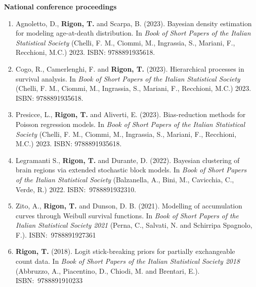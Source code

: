 \documentclass[10pt]{article}
\begin{document}
\textbf{National conference proceedings}
\begin{enumerate}
\setcounter{enumi}{\value{publications}}


\item Agnoletto, D., \textbf{Rigon, T.} and Scarpa, B. (2023). Bayesian density estimation for modeling age-at-death distribution. In \emph{Book of Short Papers of the Italian Statistical Society} (Chelli, F. M., Ciommi, M., Ingrassia, S., Mariani, F., Recchioni, M.C.) 2023. ISBN: 9788891935618. 

\item Cogo, R., Camerlenghi, F. and \textbf{Rigon, T.} (2023). Hierarchical processes in survival analysis. In \emph{Book of Short Papers of the Italian Statistical Society} (Chelli, F. M., Ciommi, M., Ingrassia, S., Mariani, F., Recchioni, M.C.) 2023. ISBN: 9788891935618. 

\item Presicce, L., \textbf{Rigon, T.} and Aliverti, E. (2023). Bias-reduction methods for Poisson regression models. In \emph{Book of Short Papers of the Italian Statistical Society} (Chelli, F. M., Ciommi, M., Ingrassia, S., Mariani, F., Recchioni, M.C.) 2023. ISBN: 9788891935618.

\item Legramanti S., \textbf{Rigon, T.} and Durante, D. (2022). Bayesian clustering of brain regions via extended stochastic block models. In \emph{Book of Short Papers of the Italian Statistical Society} (Balzanella, A., Bini, M., Cavicchia, C., Verde, R.) 2022. ISBN:~9788891932310. %

\item Zito, A., \textbf{Rigon, T.} and Dunson, D. B. (2021). Modelling of accumulation curves through Weibull survival functions. In \emph{Book of Short Papers of the Italian Statistical Society 2021} (Perna, C., Salvati, N. and Schirripa Spagnolo, F.). ISBN:~9788891927361

\item \textbf{Rigon, T.} (2018). Logit stick-breaking priors for partially exchangeable count data. In \emph{Book of Short Papers of the Italian Statistical Society 2018} (Abbruzzo, A., Piacentino, D., Chiodi, M. and Brentari, E.). ISBN:~9788891910233

\end{enumerate}

%
%
%
\end{document}
